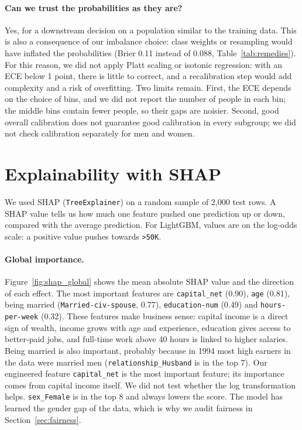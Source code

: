 \documentclass[11pt,a4paper]{article}
\begin{document}
\paragraph{Can we trust the probabilities as they are?}
Yes, for a downstream decision on a population similar to the training data. This is also a consequence of our imbalance choice: class weights or resampling would have inflated the probabilities (Brier 0.11 instead of 0.088, Table~\ref{tab:remedies}).
For this reason, we did not apply Platt scaling or isotonic regression: with an ECE below 1 point, there is little to correct, and a recalibration step would add complexity and a risk of overfitting.
Two limits remain. First, the ECE depends on the choice of bins, and we did not report the number of people in each bin; the middle bins contain fewer people, so their gaps are noisier. Second, good overall calibration does not guarantee good calibration in every subgroup; we did not check calibration separately for men and women.

\section{Explainability with SHAP}
\label{sec:shap}

We used SHAP (\texttt{TreeExplainer}) on a random sample of 2{,}000 test rows. A SHAP value tells us how much one feature pushed one prediction up or down, compared with the average prediction. For LightGBM, values are on the log-odds scale: a positive value pushes towards \texttt{>50K}.

\paragraph{Global importance.}
Figure~\ref{fig:shap_global} shows the mean absolute SHAP value and the direction of each effect.
The most important features are \texttt{capital\_net} (0.90), \texttt{age} (0.81), being married (\texttt{Married-civ-spouse}, 0.77), \texttt{education-num} (0.49) and \texttt{hours-per-week} (0.32).
These features make business sense: capital income is a direct sign of wealth, income grows with age and experience, education gives access to better-paid jobs, and full-time work above 40 hours is linked to higher salaries. Being married is also important, probably because in 1994 most high earners in the data were married men (\texttt{relationship\_Husband} is in the top 7).
Our engineered feature \texttt{capital\_net} is the most important feature; its importance comes from capital income itself. We did not test whether the log transformation helps.
\texttt{sex\_Female} is in the top 8 and always lowers the score. The model has learned the gender gap of the data, which is why we audit fairness in Section~\ref{sec:fairness}.
\end{document}
